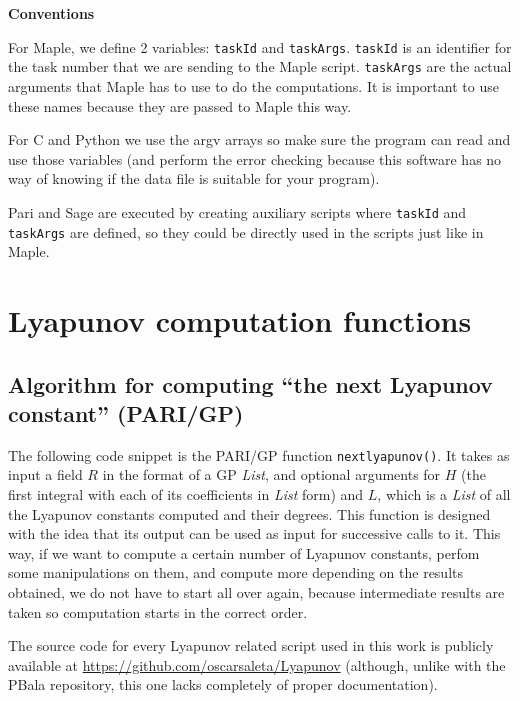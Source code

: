\begin{appendices}
\textbf{Conventions}

  For Maple, we define 2 variables: \texttt{taskId} and \texttt{taskArgs}. \texttt{taskId} is an identifier for the task number that we are sending to the Maple script. \texttt{taskArgs} are the actual arguments that Maple has to use to do the computations. It is important to use these names because they are passed to Maple this way.

  For C and Python we use the argv arrays so make sure the program can read and use those variables (and perform the error checking because this software has no way of knowing if the data file is suitable for your program).

  Pari and Sage are executed by creating auxiliary scripts where \texttt{taskId} and \texttt{taskArgs} are defined, so they could be directly used in the scripts just like in Maple.






\chapter{Lyapunov computation functions}\label{apendix.pari}

\section{Algorithm for computing ``the next Lyapunov constant'' (PARI/GP)}

The following code snippet is the PARI/GP function \texttt{nextlyapunov()}. It takes as input a field $R$ in the format of a GP \emph{List}, and optional arguments for $H$ (the first integral with each of its coefficients in \emph{List} form) and $L$, which is a \emph{List} of all the Lyapunov constants computed and their degrees. This function is designed with the idea that its output can be used as input for successive calls to it. This way, if we want to compute a certain number of Lyapunov constants, perfom some manipulations on them, and compute more depending on the results obtained, we do not have to start all over again, because intermediate results are taken so computation starts in the correct order.

The source code for every Lyapunov related script used in this work is publicly available at \url{https://github.com/oscarsaleta/Lyapunov} (although, unlike with the PBala repository, this one lacks completely of proper documentation).


\end{appendices}

